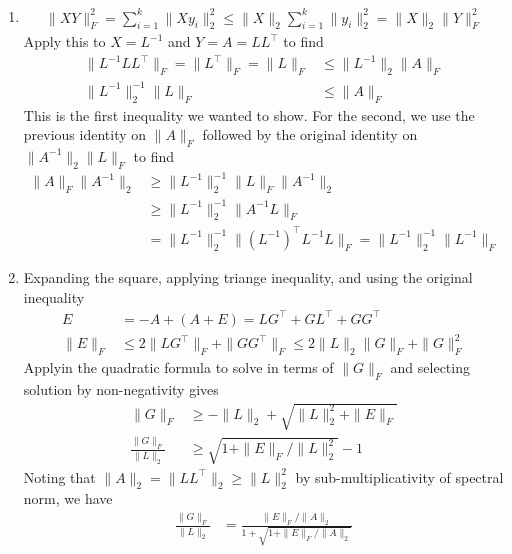 \documentclass[12pt,letterpaper,boxed]{hmcpset}
\begin{document}
\begin{problem}

\end{problem}

\begin{solution}
  \begin{enumerate}
    \item
      \begin{align}
	\|X Y\|_F^2
	= \sum_{i=1}^k \| X y_i \|_2^2
	\leq \|X\|_2 \sum_{i=1}^k \|y_i\|_2^2
	= \|X\|_2 \|Y\|_F^2
      \end{align}
      Apply this to $X = L^{-1}$ and $Y = A = L L^\top$ to find
      \begin{align}
	\| L^{-1} L L^\top \|_F
	= \| L^\top \|_F
	= \| L \|_F
	&\leq \| L^{-1}\|_2 \|A\|_F \\
	\|L^{-1}\|_2^{-1} \|L\|_F
	&\leq \|A\|_F
      \end{align}
      This is the first inequality we wanted to show.
      For the second, we use the previous identity on $\|A\|_F$
      followed by the original identity on $\|A^{-1}\|_2 \|L\|_F$
      to find
      \begin{align}
	\|A\|_F \|A^{-1}\|_2
	&\geq \|L^{-1}\|_2^{-1} \|L\|_F \|A^{-1}\|_2  \\
	&\geq \|L^{-1}\|_2^{-1} \|A^{-1} L\|_F \\
	&= \|L^{-1}\|_2^{-1} \|(L^{-1})^\top L^{-1} L\|_F
	= \|L^{-1}\|_2^{-1} \|L^{-1}\|_F
      \end{align}

    \item
      Expanding the square, applying triange inequality, and using the original
      inequality
      \begin{align}
	E
	&= -A + (A + E)
	= L G^\top + G L^\top + G G^\top \\
	\|E\|_F &\leq 2 \|L G^\top\|_F + \|G G^\top\|_F
		\leq 2 \|L\|_2 \|G\|_F + \|G\|_F^2
      \end{align}
      Applyin the quadratic formula to solve in terms of $\|G\|_F$
      and selecting solution by non-negativity gives
      \begin{align}
	\|G\|_F &\geq -\|L\|_2 + \sqrt{\|L\|_2^2 + \|E\|_F} \\
	\frac{\|G\|_F}{\|L\|_2} &\geq \sqrt{1 + \|E\|_F / \|L\|^2_2}  - 1
      \end{align}
      Noting that $\|A\|_2 = \|L L^\top\|_2 \geq \|L\|_2^2$ by
      sub-multiplicativity of spectral norm, we have
      \begin{align}
	\frac{\|G\|_F}{\|L\|_2}
	&= \frac{\|E\|_F / \|A\|_2}{1 + \sqrt{1 + \|E\|_F / \|A\|_2}}
      \end{align}


\end{enumerate}
\end{solution}
\end{document}
